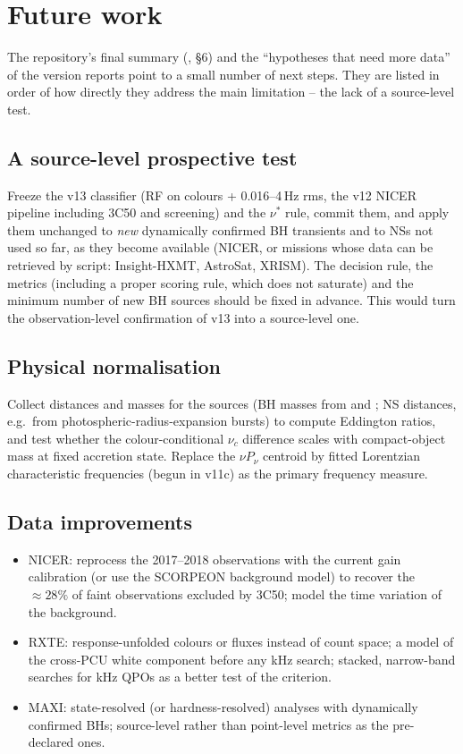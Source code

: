 \chapter{Future work}\label{ch:future}
The repository's final summary (, \S6) and the ``hypotheses that need more data'' of the version
reports point to a small number of next steps. They are listed in order of how directly they address the main limitation -- the lack of a
source-level test.

\section{A source-level prospective test}
Freeze the v13 classifier (RF on colours + 0.016--4\,Hz rms, the v12 NICER pipeline including 3C50 and screening) and the $\nu^*$ rule, commit
them, and apply them unchanged to \emph{new} dynamically confirmed BH transients and to NSs not used so far, as they become available (NICER,
or missions whose data can be retrieved by script: Insight-HXMT, AstroSat, XRISM). The decision rule, the metrics (including a proper scoring
rule, which does not saturate) and the minimum number of new BH sources should be fixed in advance. This would turn the observation-level
confirmation of v13 into a source-level one.

\section{Physical normalisation}
Collect distances and masses for the sources (BH masses from \citealt{Marcel2026} and \citealt{CorralSantana2016}; NS distances, e.g.\ from
photospheric-radius-expansion bursts) to compute Eddington ratios, and test whether the colour-conditional $\nu_c$ difference scales with
compact-object mass at fixed accretion state. Replace the $\nu P_\nu$ centroid by fitted Lorentzian characteristic frequencies (begun in
v11c) as the primary frequency measure.

\section{Data improvements}
\begin{itemize}
\item NICER: reprocess the 2017--2018 observations with the current gain calibration (or use the SCORPEON background model) to recover the
$\approx28\%$ of faint observations excluded by 3C50; model the time variation of the background.
\item RXTE: response-unfolded colours or fluxes instead of count space; a model of the cross-PCU white component before any kHz search; stacked,
narrow-band searches for kHz QPOs as a better test of the \citet{SunyaevRevnivtsev2000} criterion.
\item MAXI: state-resolved (or hardness-resolved) analyses with dynamically confirmed BHs; source-level rather than point-level metrics as
the pre-declared ones.
\end{itemize}

